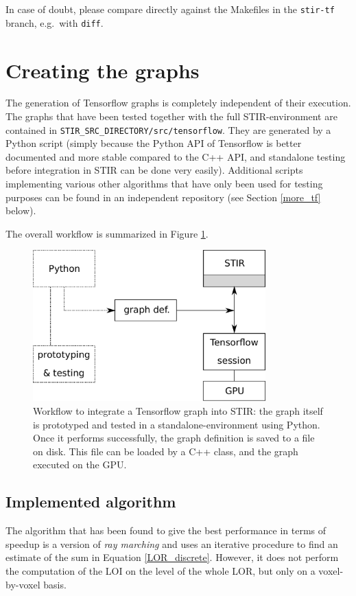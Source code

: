 \documentclass[a4paper, 11pt]{article}
\begin{document}
  In case of doubt, please compare directly against the Makefiles in the \texttt{stir-tf} branch, e.g.~with \texttt{diff}.
  
  \section{Creating the graphs}
  The generation of Tensorflow graphs is completely independent of their execution. The graphs that have been tested together with the full STIR-environment are contained in \texttt{STIR\_SRC\_DIRECTORY\-/src/tensorflow}. They are generated by a Python script (simply because the Python API of Tensorflow is better documented and more stable compared to the C++ API, and standalone testing before integration in STIR can be done very easily). Additional scripts implementing various other algorithms that have only been used for testing purposes can be found in an independent repository (see Section \ref{more_tf} below).

  The overall workflow is summarized in Figure \ref{workflow-global}.

  \begin{figure}
    \centering
    \includegraphics[width = 0.8\textwidth]{../global_workflow.pdf}
    \caption{Workflow to integrate a Tensorflow graph into STIR: the graph itself is prototyped and tested in a standalone-environment using Python. Once it performs successfully, the graph definition is saved to a file on disk. This file can be loaded by a C++ class, and the graph executed on the GPU.}
    \label{workflow-global}
  \end{figure}

  \subsection{Implemented algorithm}
  \label{raymarching}
  The algorithm that has been found to give the best performance in terms of speedup is a version of \textsl{ray marching} and uses an iterative procedure to find an estimate of the sum in Equation \ref{LOR_discrete}. However, it does not perform the computation of the LOI on the level of the whole LOR, but only on a voxel-by-voxel basis. 
\end{document}
